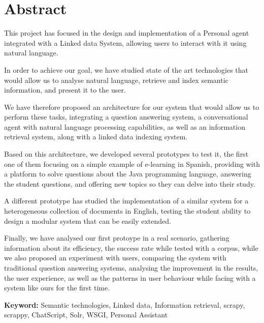\cleardoublepage
{}
\chapter*{Abstract}

This project has focused in the design and implementation of a Personal agent integrated with a Linked data System, allowing users to interact with it using natural language.

In order to achieve our goal, we have studied state of the art technologies that would allow us to analyse natural language, retrieve and index semantic information, and present it to the user.

We have therefore proposed an architecture for our system that would allow us to perform these tasks, integrating a question answering system, a conversational agent with natural language processing capabilities, as well as an information retrieval system, along with a linked data indexing system.

Based on this architecture, we developed several prototypes to test it, the first one of them focusing on a simple example of e-learning in Spanish, providing with a platform to solve questions about the Java programming language, answering the student questions, and offering new topics so they can delve into their study.

A different prototype has studied the implementation of a similar system for a heterogeneous collection of documents in English, testing the student ability to design a modular system that can be easily extended.

Finally, we have analysed our first protoype in a real scenario, gathering information about its efficiency, the success rate while tested with a corpus, while we also proposed an experiment with users, comparing the system with traditional question answering systems, analysing the improvement in the results, the user experience, as well as the patterns in user behaviour while facing with a system like ours for the first time.

\vfill
\textbf{Keyword:} Semantic technologies, Linked data, Information retrieval, scrapy, scrappy, ChatScript, Solr, WSGI, Personal Assistant